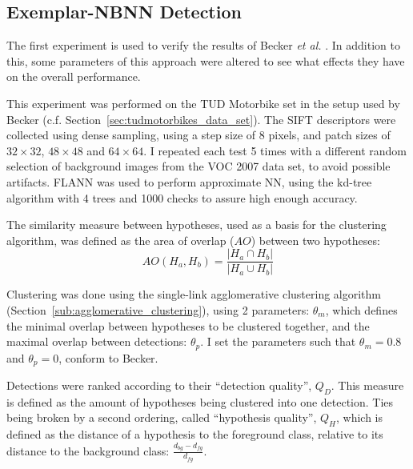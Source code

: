 % 

\subsection{Exemplar-NBNN Detection} %
\label{sec:nbnn_detection}

The first experiment is used to verify the results of Becker \emph{et al.} \cite{becker2012codebook}. In addition to this, some parameters of this approach were altered to see what effects they have on the overall performance.

This experiment was performed on the TUD Motorbike set in the setup used by Becker (c.f. Section~\ref{sec:tudmotorbikes_data_set}). The SIFT descriptors were collected using dense sampling, using a step size of 8 pixels, and patch sizes of $32\times32$, $48\times48$ and $64\times64$. I repeated each test 5 times with a different random selection of background images from the VOC 2007 data set, to avoid possible artifacts. FLANN was used to perform approximate NN, using the kd-tree algorithm with 4 trees and 1000 checks to assure high enough accuracy.

The similarity measure between hypotheses, used as a basis for the clustering algorithm, was defined as the area of overlap ($AO$) between two hypotheses:
\begin{equation}
    AO(H_a, H_b)= \frac{|H_a\cap H_b|}{|H_a\cup H_b|}
\end{equation}

Clustering was done using the single-link agglomerative clustering algorithm (Section~\ref{sub:agglomerative_clustering}), using 2 parameters: $\theta_m$, which defines the minimal overlap between hypotheses to be clustered together, and the maximal overlap between detections: $\theta_p$. I set the parameters such that $\theta_m = 0.8$ and $\theta_p = 0$, conform to Becker.

Detections were ranked according to their ``detection quality'', $Q_D$. This measure is defined as the amount of hypotheses being clustered into one detection. Ties being broken by a second ordering, called ``hypothesis quality'', $Q_H$, which is defined as the distance of a hypothesis to the foreground class, relative to its distance to the background class: $\frac{d_{bg} - d_{fg}}{d_{fg}}$. 

